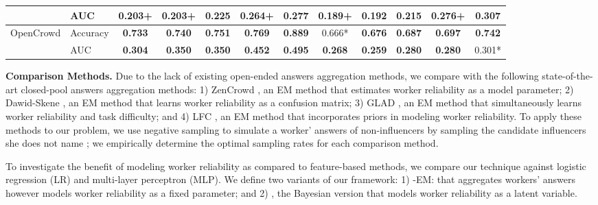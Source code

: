 \begin{table}[t]
\begin{tabular}{ll|ccccc|ccccc}
                             & AUC   & 0.203+         & 0.203+         & 0.225          & 0.264+         & 0.277          & 0.189+         & 0.192          & 0.215          & 0.276+         & \textbf{0.307}         \\ \hline
\multirow{2}{*}{OpenCrowd}   & Accuracy     & \textbf{0.733} & \textbf{0.740} & \textbf{0.751}         & \textbf{0.769} & \textbf{0.889}  & 0.666* & \textbf{0.676} &\textbf{0.687}         & \textbf{0.697}         & \textbf{0.742} \\ %
                             & AUC   & \textbf{0.304} & \textbf{0.350} & \textbf{0.350} & \textbf{0.452} & \textbf{0.495} & \textbf{0.268} & \textbf{0.259} & \textbf{0.280} & \textbf{0.280}  &  0.301*\\ \bottomrule
\end{tabular}
 \label{sec:compres}  
\end{table}

\smallskip
\noindent\textbf{Comparison Methods.} Due to the lack of existing open-ended answers aggregation methods, we compare with the following state-of-the-art closed-pool answers aggregation methods: 1) ZenCrowd \cite{demartini2012zencrowd}, an EM method that estimates worker reliability as a model parameter; 2) Dawid-Skene \cite{dawid1979maximum}, an EM method that learns worker reliability as a confusion matrix; 3) GLAD \cite{whitehill2009whose}, an EM method that simultaneously learns worker reliability and task difficulty; and 4) LFC \cite{raykar2010learning}, an EM method 
that incorporates priors in modeling worker reliability. To apply these methods to our problem, we use negative sampling to simulate a worker' answers of non-influencers by sampling the candidate influencers she does not name ; we empirically determine the optimal sampling rates for each comparison method. 

To investigate the benefit of modeling worker reliability as compared to feature-based methods, we compare our technique against logistic regression (LR) and multi-layer perceptron (MLP). We define two variants of our framework: 1) \sys-EM: \sys that aggregates workers' answers however models worker reliability as a fixed parameter; and 2) \sys, the Bayesian version that models worker reliability as a latent variable.





